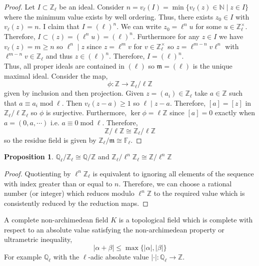 \documentclass{article}
\newcommand{\divides}{\mid}
\newcommand{\Z}{\mathbb{Z}}
\newcommand{\Q}{\mathbb{Q}}
\newcommand{\N}{\mathbb{N}}
\theoremstyle{definition}
\newtheorem{proposition}[theorem]{Proposition}
\newenvironment{definition}[1][Definition:]{\begin{trivlist}
\item[\hskip \labelsep {\bfseries #1}]}{\end{trivlist}}
\newcommand{\finfield}[1]{\mathbb{F}_{#1}}
\begin{document}
\begin{proof}
Let $I \subset \Z_{\ell}$ be an ideal. Consider $n = v_{\ell}(I) = \min \{ v_{\ell}(z) \in \N \mid z \in I \}$ where the minimum value exists by well ordering. Thus, there exists $z_0 \in I$ with $v_{\ell}(z) = n$. I claim that $I = (\ell)^n$. We can write $z_0 = \ell^n u$ for some $u \in \Z_{\ell}^\times$. Therefore, $I \subset (z) = (\ell^n u) = (\ell)^n$. Furthermore for any $z \in I$ we have $v_{\ell}(z) = m \ge n$ so $\ell^n \divides z$ since $z = \ell^m v$ for $v \in \Z_{\ell}^\times$ so $z = \ell^{m - n} v \ell^n$ with $\ell^{m - n} v \in \Z_{\ell}$ and thus $z \in (\ell)^n$. Therefore, $I = (\ell)^n$. 
\bigskip\\
Thus, all proper ideals are contained in $(\ell)$ so $\mathfrak{m} = (\ell)$ is the unique maximal ideal. Consider the map,
\[ \phi : \Z \to \Z_{\ell} / \ell \Z \]
given by inclusion and then projection. Given $z = (a_i) \in \Z_{\ell}$ take $a \in \Z$ such that $a \equiv a_i \; \mathrm{mod} \; {\ell}$. Then $v_{\ell}(z - a) \ge 1$ so $\ell \divides z - a$. Therefore, $[a] = [z]$ in $\Z_{\ell} / \ell \Z_{\ell}$ so $\phi$ is surjective. Furthermore, $\ker{\phi} = \ell \Z$ since $[a] = 0$ exactly when $a = (0, a, \cdots)$ i.e. $a \equiv 0 \; \mathrm{mod} \; \ell$. Therefore,
\[ \Z / \ell \Z \cong \Z_{\ell} / \ell \Z \]
so the residue field is given by $\Z_{\ell} / \mathfrak{m} \cong \finfield{\ell}$.  
\end{proof}

\begin{proposition}
$\Q_{\ell} / \Z_{\ell} \cong \Q / \Z$ and $\Z_{\ell} / \ell^n \Z_{\ell} \cong \Z / \ell^n \Z$
\end{proposition}

\begin{proof}
Quotienting by $\ell^n \Z_{\ell}$ is equivalent to ignoring all elements of the sequence with index greater than or equal to $n$. Therefore, we can choose a rational number (or integer) which reduces modulo $\ell^{n} \Z$ to the required value which is consistently reduced by the reduction maps.  
\end{proof}

\begin{definition}
A complete non-archimedean field $K$ is a topological field which is complete with respect to an absolute value satisfying the non-archimedean property or ultrametric inequality,
\[ |\alpha + \beta| \le \max\{|\alpha|, |\beta|\} \]
For example $\Q_{\ell}$ with the $\ell$-adic absolute value $| \cdot | : \Q_{\ell} \to \Z$. 
\end{definition}
\end{document}
